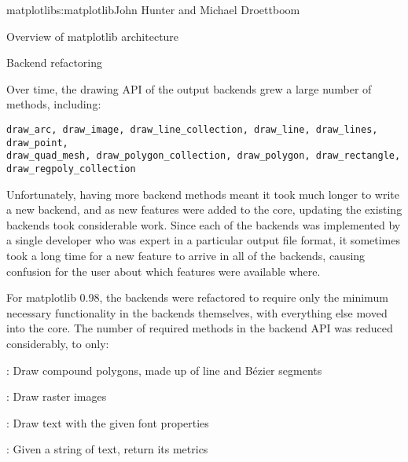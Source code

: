 \begin{aosachapter}{matplotlib}{s:matplotlib}{John Hunter and Michael Droettboom}
\begin{aosasect1}{Overview of matplotlib architecture}
\end{aosasect1}


\begin{aosasect1}{Backend refactoring}


Over time, the drawing API of the output backends grew a large number
of methods, including:

\begin{verbatim}
draw_arc, draw_image, draw_line_collection, draw_line, draw_lines, draw_point,
draw_quad_mesh, draw_polygon_collection, draw_polygon, draw_rectangle,
draw_regpoly_collection
\end{verbatim}

Unfortunately, having more backend methods meant it took much longer
to write a new backend, and as new features were added to the core,
updating the existing backends took considerable work.  Since each of
the backends was implemented by a single developer who was expert in a
particular output file format, it sometimes took a long time for a new
feature to arrive in all of the backends, causing confusion for the
user about which features were available where.

For matplotlib 0.98, the backends were refactored to require only the
minimum necessary functionality in the backends themselves, with
everything else moved into the core.  The number of required methods
in the backend API was reduced considerably, to only:

\begin{aosaitemize}

  \item {}: Draw compound polygons, made up of line and
    B\'ezier segments

  \item {}: Draw raster images

  \item {}: Draw text with the given font properties

  \item {}: Given a string of
    text, return its metrics

\end{aosaitemize}


\end{aosasect1}
\end{aosachapter}
